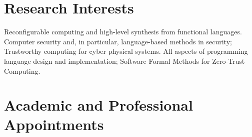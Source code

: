 \documentclass[12pt]{article} %
\begin{document}
%
%


\section*{Research Interests}

Reconfigurable computing and high-level synthesis from functional languages.
Computer security and, in particular, 
language-based methods in security; Trustworthy computing for cyber physical systems.
All aspects of programming language
design and implementation; Software Formal Methods for Zero-Trust Computing.
 



\section*{Academic and Professional Appointments}
\end{document}
